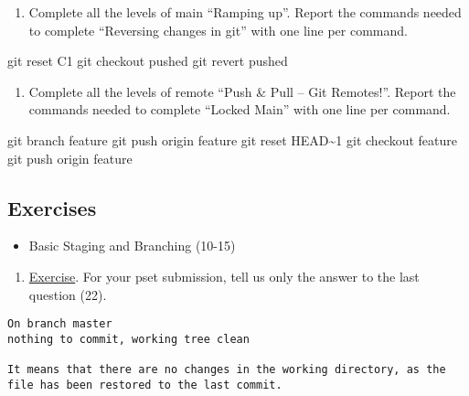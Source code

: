 \documentclass[
  letterpaper,
  DIV=11,
  numbers=noendperiod]{scrartcl}
\newenvironment{Shaded}{\begin{snugshade}}{\end{snugshade}}
\newcommand{\NormalTok}[1]{\textcolor[rgb]{0.00,0.23,0.31}{#1}}
\providecommand{\tightlist}{%
  \setlength{\itemsep}{0pt}\setlength{\parskip}{0pt}}\usepackage{longtable,booktabs,array}
\begin{document}
\begin{enumerate}
\def\labelenumi{\arabic{enumi}.}
\setcounter{enumi}{1}
\tightlist
\item
  Complete all the levels of main ``Ramping up''. Report the commands
  needed to complete ``Reversing changes in git'' with one line per
  command.
\end{enumerate}

\begin{Shaded}
\begin{Highlighting}[]
\NormalTok{git reset C1}
\NormalTok{git checkout pushed}
\NormalTok{git revert pushed}
\end{Highlighting}
\end{Shaded}

\begin{enumerate}
\def\labelenumi{\arabic{enumi}.}
\setcounter{enumi}{2}
\tightlist
\item
  Complete all the levels of remote ``Push \& Pull -- Git Remotes!''.
  Report the commands needed to complete ``Locked Main'' with one line
  per command.
\end{enumerate}

\begin{Shaded}
\begin{Highlighting}[]
\NormalTok{git branch feature}
\NormalTok{git push origin feature}
\NormalTok{git reset HEAD\textasciitilde{}1}
\NormalTok{git checkout feature}
\NormalTok{git push origin feature}
\end{Highlighting}
\end{Shaded}

\subsection{Exercises}\label{exercises}

\begin{itemize}
\tightlist
\item
  Basic Staging and Branching (10-15)
\end{itemize}

\begin{enumerate}
\def\labelenumi{\arabic{enumi}.}
\tightlist
\item
  \href{https://github.com/eficode-academy/git-katas/blob/master/basic-staging/README.md}{Exercise}.
  For your pset submission, tell us only the answer to the last question
  (22).
\end{enumerate}

\begin{verbatim}
On branch master
nothing to commit, working tree clean

It means that there are no changes in the working directory, as the file has been restored to the last commit.
\end{verbatim}
\end{document}
